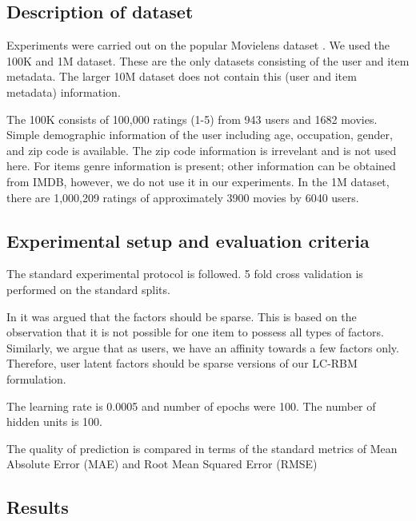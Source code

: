 \documentclass[conference]{IEEEtran}
\begin{document}
  \subsection{Description of dataset}

    Experiments were carried out on the popular Movielens dataset \cite{Harper}. We used the 100K and 1M dataset. These are the only datasets consisting of the user and item metadata. The larger 10M dataset does not contain this (user and item metadata) information.

    The 100K consists of 100,000 ratings (1-5) from 943 users and 1682 movies. Simple demographic information of the user including age, occupation, gender, and zip code is available. The zip code information is irrevelant\cite{Gogna3} and is not used here. For items genre information is present; other information can be obtained from IMDB, however, we do not use it in our experiments. In the 1M dataset, there are 1,000,209 ratings of approximately 3900 movies by 6040 users.

  \subsection{Experimental setup and evaluation criteria}

The standard experimental protocol is followed. 5 fold cross validation is performed on the standard splits.

In \cite{Gogna1} it was argued that the factors should be sparse. This is based on the observation that it is not possible for one item to possess all types of factors. Similarly, we argue that as users, we have an affinity towards a few factors only. Therefore, user latent factors should be sparse versions of our LC-RBM formulation. 

The learning rate is 0.0005 and number of epochs were 100. The number of hidden units is 100.

The quality of prediction is compared in terms of the standard metrics of Mean Absolute Error (MAE) and Root Mean Squared Error (RMSE)



\subsection{Results}
\end{document}
